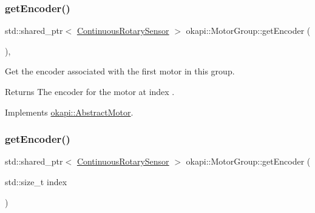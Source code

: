 \mbox{\label{classokapi_1_1MotorGroup_a911d4c2a66deafb2e54f66411eceaa59}} 
\subsubsection{\texorpdfstring{getEncoder()}{getEncoder()}\hspace{0.1cm}{\footnotesize\ttfamily [1/2]}}
{\footnotesize\ttfamily std\+::shared\+\_\+ptr$<$ \mbox{\hyperlink{classokapi_1_1ContinuousRotarySensor}{Continuous\+Rotary\+Sensor}} $>$ okapi\+::\+Motor\+Group\+::get\+Encoder (\begin{DoxyParamCaption}{ }\end{DoxyParamCaption})\hspace{0.3cm}{\ttfamily [override]}, {\ttfamily [virtual]}}

Get the encoder associated with the first motor in this group.

\begin{DoxyReturn}{Returns}
The encoder for the motor at index {}. 
\end{DoxyReturn}


Implements \mbox{\hyperlink{classokapi_1_1AbstractMotor_a87177280c20a855a74354dd8ba6e1d6a}{okapi\+::\+Abstract\+Motor}}.

\mbox{\label{classokapi_1_1MotorGroup_a2aa788f537f4d02f80098895a2ee1eab}} 
\subsubsection{\texorpdfstring{getEncoder()}{getEncoder()}\hspace{0.1cm}{\footnotesize\ttfamily [2/2]}}
{\footnotesize\ttfamily std\+::shared\+\_\+ptr$<$ \mbox{\hyperlink{classokapi_1_1ContinuousRotarySensor}{Continuous\+Rotary\+Sensor}} $>$ okapi\+::\+Motor\+Group\+::get\+Encoder (\begin{DoxyParamCaption}\item[{std\+::size\+\_\+t}]{index }\end{DoxyParamCaption})\hspace{0.3cm}{\ttfamily [virtual]}}

